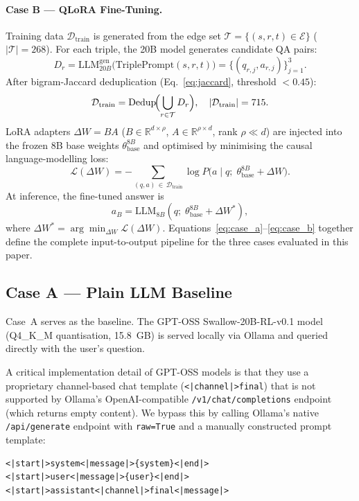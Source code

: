 \documentclass[twocolumn]{article}
\begin{document}
\paragraph{Case B --- QLoRA Fine-Tuning.}
Training data $\mathcal{D}_{\mathrm{train}}$ is generated from the edge set
$\mathcal{T}=\{(s,r,t)\in\mathcal{E}\}$ ($|\mathcal{T}|=268$).
For each triple, the 20B model generates candidate QA pairs:
\begin{equation}
  D_r = \mathrm{LLM}_{20B}^{\mathrm{gen}}\!\bigl(\mathrm{TriplePrompt}(s,r,t)\bigr)
       = \{(q_{r,j},a_{r,j})\}_{j=1}^{3}.
  \label{eq:data_gen}
\end{equation}
After bigram-Jaccard deduplication (Eq.~\ref{eq:jaccard}, threshold $<0.45$):
\begin{equation}
  \mathcal{D}_{\mathrm{train}}
  = \mathrm{Dedup}\!\Bigl(\bigcup_{r\in\mathcal{T}} D_r\Bigr),\quad
  |\mathcal{D}_{\mathrm{train}}| = 715.
  \label{eq:dedup}
\end{equation}
LoRA adapters $\Delta W = BA$ ($B\in\mathbb{R}^{d\times\rho}$, $A\in\mathbb{R}^{\rho\times d}$,
rank $\rho\ll d$) are injected into the frozen 8B base weights $\theta_{\mathrm{base}}^{8B}$
and optimised by minimising the causal language-modelling loss:
\begin{equation}
  \mathcal{L}(\Delta W) =
  -\sum_{(q,a)\,\in\,\mathcal{D}_{\mathrm{train}}}
  \log P\!\bigl(a\mid q;\; \theta_{\mathrm{base}}^{8B} + \Delta W\bigr).
  \label{eq:lora_loss}
\end{equation}
At inference, the fine-tuned answer is
\begin{equation}
  a_B = \mathrm{LLM}_{8B}\!\left(q;\; \theta_{\mathrm{base}}^{8B} + \Delta W^*\right),
  \label{eq:case_b}
\end{equation}
where $\Delta W^* = \arg\min_{\Delta W}\mathcal{L}(\Delta W)$.
Equations~\ref{eq:case_a}--\ref{eq:case_b} together define the complete
input-to-output pipeline for the three cases evaluated in this paper.

\subsection{Case A --- Plain LLM Baseline}
\label{sec:case_a}

Case~A serves as the baseline.
The GPT-OSS Swallow-20B-RL-v0.1 model (Q4\_K\_M quantisation, 15.8~GB) is served locally
via Ollama and queried directly with the user's question.

A critical implementation detail of GPT-OSS models is that they use a proprietary channel-based
chat template (\texttt{<|channel|>final}) that is not supported by Ollama's OpenAI-compatible
\texttt{/v1/chat/completions} endpoint (which returns empty content).
We bypass this by calling Ollama's native \texttt{/api/generate} endpoint with
\texttt{raw=True} and a manually constructed prompt template:
\begin{verbatim}
<|start|>system<|message|>{system}<|end|>
<|start|>user<|message|>{user}<|end|>
<|start|>assistant<|channel|>final<|message|>
\end{verbatim}
\end{document}
